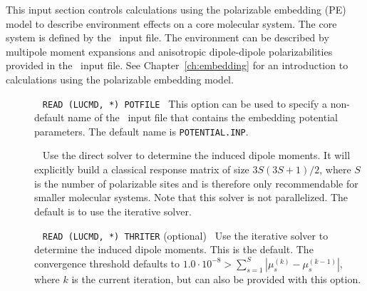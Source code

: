 This input section controls calculations using the polarizable embedding (PE) model to describe environment effects on a core molecular system. The core system is defined by the \mol\ input file. The environment can be described by multipole moment expansions and anisotropic dipole-dipole polarizabilities provided in the \pot\ input file. See Chapter~\ref{ch:embedding} for an introduction to calculations using the polarizable embedding model.


\begin{description}

\item[]\verb| |\newline
\verb|READ (LUCMD, *) POTFILE|\verb| |\newline
This option can be used to specify a non-default name of the \pot\ input file that contains the embedding potential parameters. The default name is \verb|POTENTIAL.INP|.

\item[]\verb| |\newline
Use the direct solver to determine the induced dipole moments. It will explicitly build a classical response matrix of size $3S(3S+1)/2$, where $S$ is the number of polarizable sites and is therefore only recommendable for smaller molecular systems. Note that this solver is not parallelized. The default is to use the iterative solver.

\item[]\verb| |\newline
\verb|READ (LUCMD, *) THRITER| (optional)\verb| |\newline
Use the iterative solver to determine the induced dipole moments. This is the default. The convergence threshold defaults to $1.0\cdot10^{-8} > \sum_{s=1}^{S}|\mu_s^{(k)} - \mu_s^{(k-1)}|$, where $k$ is the current iteration, but can also be provided with this option.


\end{description}

